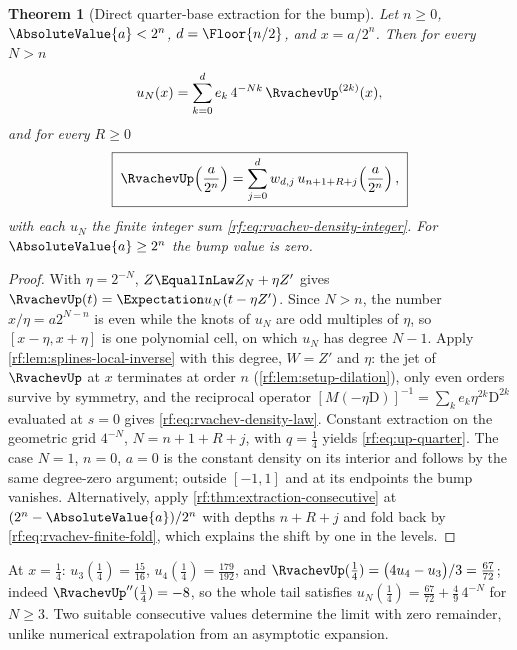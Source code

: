 \documentclass[11pt,oneside]{article}
\theoremstyle{plain}
\newtheorem{theorem}{Theorem}[section]
\theoremstyle{definition}
\theoremstyle{remark}
\newcommand{\up}{\RvachevUp}                %
\newcommand{\E}{\Expectation}
\newcommand{\Dop}{\mathrm{D}}               %
\begin{document}
\begin{theorem}[Direct quarter-base extraction for the bump]
\label{rf:thm:up-quarter}
Let $n\ge0$, $\AbsoluteValue{a}<2^{n}$, $d=\Floor{n/2}$, and $x=a/2^{n}$.
Then for every $N>n$
\begin{equation}
 u_{N}(x)=\sum_{k=0}^{d}e_{k}\,4^{-Nk}\,\up^{(2k)}(x),
 \label{rf:eq:rvachev-density-law}
\end{equation}
and for every $R\ge0$
\begin{equation}
 \boxed{\;
 \up\!\left(\frac{a}{2^{n}}\right)
 =\sum_{j=0}^{d}w_{d,j}\,u_{n+1+R+j}\!\left(\frac{a}{2^{n}}\right),\;}
 \label{rf:eq:up-quarter}
\end{equation}
with each $u_{N}$ the finite integer sum \cref{rf:eq:rvachev-density-integer}.
For $\AbsoluteValue{a}\ge2^{n}$ the bump value is zero.
\end{theorem}

\begin{proof}
With $\eta=2^{-N}$, $Z\EqualInLaw Z_{N}+\eta Z'$ gives $\up(t)=\E u_{N}(t-\eta Z')$.
Since $N>n$, the number $x/\eta=a2^{N-n}$ is even while the knots of $u_{N}$
are odd multiples of $\eta$, so $[x-\eta,x+\eta]$ is one polynomial cell, on
which $u_{N}$ has degree $N-1$.  Apply \cref{rf:lem:splines-local-inverse}
with this degree, $W=Z'$ and $\eta$: the jet of $\up$ at $x$ terminates at
order $n$ (\cref{rf:lem:setup-dilation}), only even orders survive by
symmetry, and the reciprocal operator $[M(-\eta\Dop)]^{-1}=\sum_{k}e_{k}\eta^{2k}\Dop^{2k}$
evaluated at $s=0$ gives \cref{rf:eq:rvachev-density-law}.  Constant
extraction on the geometric grid $4^{-N}$, $N=n+1+R+j$, with $q=\tfrac14$
yields \cref{rf:eq:up-quarter}.  The case $N=1$, $n=0$, $a=0$ is the
constant density on its interior and follows by the same degree-zero
argument; outside $[-1,1]$ and at its endpoints the bump vanishes.
Alternatively, apply \cref{rf:thm:extraction-consecutive} at
$(2^{n}-\AbsoluteValue{a})/2^{n}$ with depths $n+R+j$ and fold back by
\cref{rf:eq:rvachev-finite-fold}, which explains the shift by one in the
levels.
\end{proof}

At $x=\tfrac14$: $u_{3}(\tfrac14)=\tfrac{15}{16}$, $u_{4}(\tfrac14)=\tfrac{179}{192}$,
and $\up(\tfrac14)=\bigl(4u_{4}-u_{3}\bigr)/3=\tfrac{67}{72}$; indeed
$\up''(\tfrac14)=-8$, so the whole tail satisfies
$u_{N}(\tfrac14)=\tfrac{67}{72}+\tfrac49\,4^{-N}$ for $N\ge3$.  Two suitable
consecutive values determine the limit with zero remainder, unlike
numerical extrapolation from an asymptotic expansion.
\end{document}

